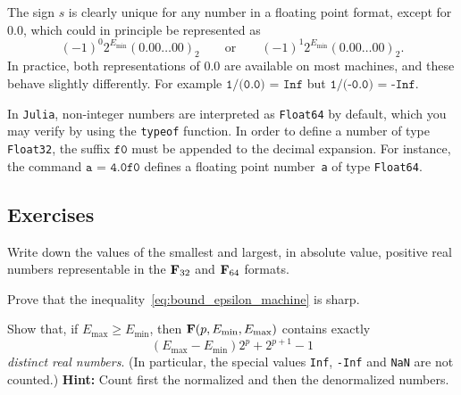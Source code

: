 
\begin{remark}
    The sign $s$ is clearly unique for any number in a floating point format,
    except for $0.0$,
    which could in principle be represented as
    \[
        (-1)^0 2^{E_{\min}} (0.00\dots00)_2
        \qquad \text{or} \qquad
        (-1)^1 2^{E_{\min}} (0.00\dots00)_2.
    \]
    In practice, both representations of 0.0 are available on most machines,
    and these behave slightly differently.
    For example $\texttt{1/(0.0) = Inf}$ but $\texttt{1/(-0.0) = -Inf}$.
\end{remark}

In \texttt{Julia}, non-integer numbers are interpreted as \texttt{Float64} by default,
which you may verify by using the \texttt{typeof} function.
In order to define a number of type \texttt{Float32},
the suffix $\texttt{f0}$ must be appended to the decimal expansion.
For instance, the command $\texttt{a = 4.0f0}$ defines a floating point number~\texttt{a} of type \texttt{Float64}.

\subsection{Exercises}%
\label{sub:exercises}

\begin{exercise}
    Write down the values of the smallest and largest, in absolute value,
    positive real numbers representable in the $\mathbf F_{32}$ and $\mathbf F_{64}$ formats.
\end{exercise}

\begin{exercise}
    \label{exercise:machine_epsilon}
    Prove that the inequality~\eqref{eq:bound_epsilon_machine} is sharp.
\end{exercise}

\begin{exercise}
    Show that, if $E_{\max} \geq E_{\min}$, then $\mathbf F(p, E_{\min}, E_{\max})$ contains exactly
    \[
        (E_{\max} - E_{\min}) 2^{p} + 2^{p+1} - 1
    \]
    \emph{distinct real numbers}.
    (In particular, the special values \texttt{Inf}, \texttt{-Inf} and \texttt{NaN} are not counted.)
    \textbf{Hint:} Count first the normalized and then the denormalized numbers.
\end{exercise}

